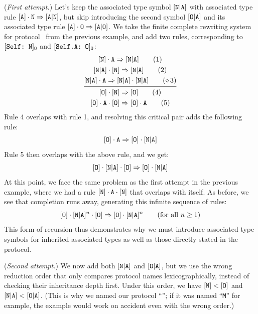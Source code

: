 \documentclass[../generics]{subfiles}
\begin{document}
\begin{example}
(\emph{First attempt.}) Let's keep the associated type symbol $[\texttt{N}|\texttt{A}]$ with associated type rule $[\texttt{A}]\cdot\texttt{N}\Rightarrow[\texttt{A}|\texttt{N}]$, but skip introducing the second symbol $[\texttt{O}|\texttt{A}]$ and its associated type rule $[\texttt{A}]\cdot\texttt{O}\Rightarrow[\texttt{A}|\texttt{O}]$. We take the finite complete rewriting system for protocol \tN\ from the previous example, and add two rules, corresponding to $[\texttt{Self:~N}]_{\texttt{O}}$ and $[\texttt{Self.A:~O}]_{\texttt{O}}$:
\begin{gather*}
\AssocIntro{N}{A}\tag{1}\\
\ProtoConf{\aNA}{N}\tag{2}\\
\aNA\cdot\nA\Red\aNA\cdot\aNA\tag{$\CRule{3}$}\\
\midrule
\ProtoConf{\pO}{N}\tag{4}\\
\ProtoConf{\pO\cdot\nA}{O}\tag{5}
\end{gather*}
Rule 4 overlaps with rule 1, and resolving this critical pair adds the following rule:
\[
[\texttt{O}]\cdot\texttt{A} \Rightarrow [\texttt{O}]\cdot[\texttt{N}|\texttt{A}]
\]
Rule 5 then overlaps with the above rule, and we get:
\[
[\texttt{O}]\cdot[\texttt{N}|\texttt{A}]\cdot[\texttt{O}] \Rightarrow [\texttt{O}]\cdot[\texttt{N}|\texttt{A}]
\]
At this point, we face the same problem as the first attempt in the previous example, where we had a rule $[\texttt{N}]\cdot\texttt{A}\cdot[\texttt{N}]$ that overlaps with itself. As before, we see that completion runs away, generating this infinite sequence of rules:
\[
[\texttt{O}]\cdot[\texttt{N}|\texttt{A}]^n\cdot[\texttt{O}] \Rightarrow [\texttt{O}]\cdot[\texttt{N}|\texttt{A}]^n \tag{for all $n \geq 1$}
\]
This form of recursion thus demonstrates why we must introduce associated type symbols for inherited associated types as well as those directly stated in the protocol.

\smallskip

(\emph{Second attempt.}) We now add both $[\texttt{N}|\texttt{A}]$ and $[\texttt{O}|\texttt{A}]$, but we use the wrong reduction order that only compares protocol names lexicographically, instead of checking their inheritance depth first. Under this order, we have $[\texttt{N}] < [\texttt{O}]$ and $[\texttt{N}|\texttt{A}] < [\texttt{O}|\texttt{A}]$. (This is why we named our protocol ``\tO''; if it was named ``\texttt{M}'' for example, the example would work on accident even with the wrong order.)


\end{example}
\end{document}
